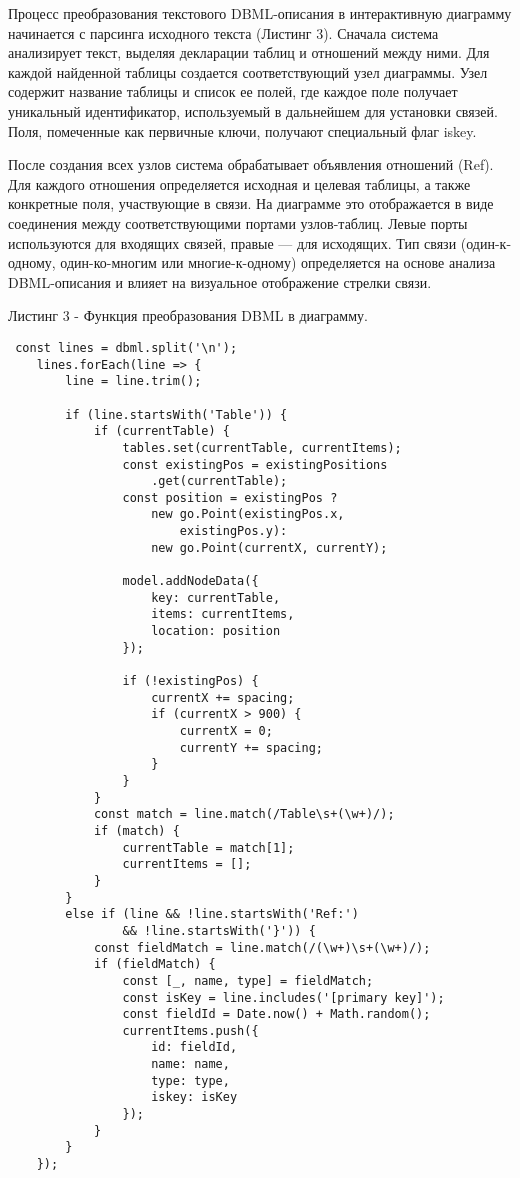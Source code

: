 Процесс преобразования текстового DBML-описания в интерактивную диаграмму начинается с парсинга исходного текста (Листинг 3). Сначала система анализирует текст, выделяя декларации таблиц и отношений между ними. Для каждой найденной таблицы создается соответствующий узел диаграммы. Узел содержит название таблицы и список ее полей, где каждое поле получает уникальный идентификатор, используемый в дальнейшем для установки связей. Поля, помеченные как первичные ключи, получают специальный флаг iskey.

После создания всех узлов система обрабатывает объявления отношений (Ref). Для каждого отношения определяется исходная и целевая таблицы, а также конкретные поля, участвующие в связи. На диаграмме это отображается в виде соединения между соответствующими портами узлов-таблиц. Левые порты используются для входящих связей, правые — для исходящих. Тип связи (один-к-одному, один-ко-многим или многие-к-одному) определяется на основе анализа DBML-описания и влияет на визуальное отображение стрелки связи.

Листинг 3 - Функция преобразования DBML в диаграмму.
\begin{lstlisting}
 const lines = dbml.split('\n');
    lines.forEach(line => {
        line = line.trim();

        if (line.startsWith('Table')) {
            if (currentTable) {
                tables.set(currentTable, currentItems);
                const existingPos = existingPositions
                    .get(currentTable);
                const position = existingPos ?
                    new go.Point(existingPos.x, 
                        existingPos.y):
                    new go.Point(currentX, currentY);

                model.addNodeData({
                    key: currentTable,
                    items: currentItems,
                    location: position
                });

                if (!existingPos) {
                    currentX += spacing;
                    if (currentX > 900) {
                        currentX = 0;
                        currentY += spacing;
                    }
                }
            }
            const match = line.match(/Table\s+(\w+)/);
            if (match) {
                currentTable = match[1];
                currentItems = [];
            }
        }
        else if (line && !line.startsWith('Ref:') 
                && !line.startsWith('}')) {
            const fieldMatch = line.match(/(\w+)\s+(\w+)/);
            if (fieldMatch) {
                const [_, name, type] = fieldMatch;
                const isKey = line.includes('[primary key]');
                const fieldId = Date.now() + Math.random();
                currentItems.push({
                    id: fieldId,
                    name: name,
                    type: type,
                    iskey: isKey
                });
            }
        }
    });
\end{lstlisting}

